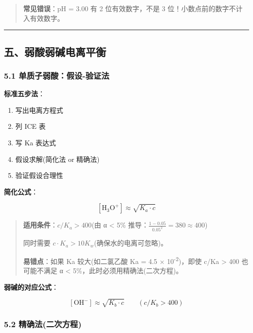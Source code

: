 \documentclass[a4paper,11pt]{ctexart}
\providecommand{\tightlist}{\setlength{\itemsep}{0pt}\setlength{\parskip}{0pt}}
\newcommand{\箭}{\ensuremath{\rightarrow}}
\newcommand{\左箭}{\ensuremath{\leftarrow}}
\newcommand{\上箭}{\ensuremath{\uparrow}}
\newcommand{\下箭}{\ensuremath{\downarrow}}
\newcommand{\衡}{\ensuremath{\rightleftharpoons}}
\newcommand{\双箭}{\ensuremath{\leftrightarrow}}
\newcommand{\约等于}{\ensuremath{\approx}}
\newcommand{\小于等于}{\ensuremath{\leq}}
\newcommand{\大于等于}{\ensuremath{\geq}}
\newcommand{\不等于}{\ensuremath{\neq}}
\newcommand{\西格马}{\ensuremath{\sigma}}
\newcommand{\派}{\ensuremath{\pi}}
\begin{document}
\begin{quote}
\textbf{常见错误}：pH = 3.00 有 2 位有效数字，不是 3 位！小数点前的数字不计入有效数字。
\end{quote}

\begin{center}\rule{0.5\linewidth}{0.5pt}\end{center}

\subsection{五、弱酸弱碱电离平衡}\label{ux4e94ux5f31ux9178ux5f31ux78b1ux7535ux79bbux5e73ux8861}

\subsubsection{5.1 单质子弱酸：假设-验证法}\label{ux5355ux8d28ux5b50ux5f31ux9178ux5047ux8bbe-ux9a8cux8bc1ux6cd5}

\textbf{标准五步法}：

\begin{enumerate}
\def\labelenumi{\arabic{enumi}.}
\tightlist
\item
  写出电离方程式
\item
  列 ICE 表
\item
  写 Ka 表达式
\item
  假设求解(简化法 or 精确法)
\item
  验证假设合理性
\end{enumerate}

\textbf{简化公式}：

\[
[\mathrm{H_3O^+}] \approx \sqrt{K_a \cdot c}
\]

\begin{quote}
\textbf{适用条件}：\(c/K_a > 400\)(由 α \textless{} 5\% 推导：\(\frac{1-0.05}{0.05^2} = 380 \approx 400\))

同时需要 \(c \cdot K_a > 10 K_w\)(确保水的电离可忽略)。

\textbf{易错点}：如果 Ka 较大(如二氯乙酸 Ka = 4.5 × 10\textsuperscript{-2})，即使 c/Ka \textgreater{} 400 也可能不满足 α \textless{} 5\%，此时必须用精确法(二次方程)。
\end{quote}

\textbf{弱碱的对应公式}：

\[
[\mathrm{OH^-}] \approx \sqrt{K_b \cdot c} \qquad (c/K_b > 400)
\]

\subsubsection{5.2 精确法(二次方程)}\label{ux7cbeux786eux6cd5ux4e8cux6b21ux65b9ux7a0b}
\end{document}
